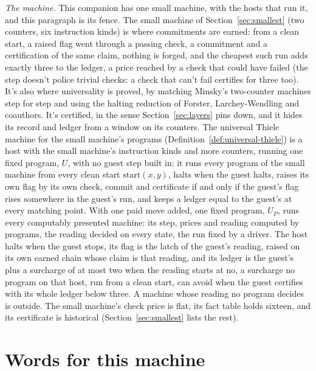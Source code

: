 \documentclass[11pt,twoside]{article}
\theoremstyle{thielethm}
\theoremstyle{thieledef}
\theoremstyle{thieledef}
\theoremstyle{thieledef}
\theoremstyle{thielethm}
\theoremstyle{thieleobs}
\theoremstyle{thielethm}
\begin{document}
\emph{The machine.} This companion has one small machine, with the hosts that run it,
and this paragraph is its fence. The small machine of
Section~\ref{sec:smallest} (two counters, six instruction kinds) is where commitments are
earned: from a clean start, a raised flag went through a passing check, a commitment and a certification of the
same claim, nothing is forged, and the cheapest such run adds exactly three to the ledger, a price reached
by a check that could have failed (the step doesn't police trivial checks: a check that can't
fail certifies for three too). It's also
where universality is proved, by matching Minsky's two-counter machines step for step and
using the halting reduction of Forster, Larchey-Wendling and coauthors. It's certified, in the
sense Section~\ref{sec:layers} pins down, and it hides its record and ledger from a window on its
counters. The universal Thiele machine for the small machine's
programs (Definition~\ref{def:universal-thiele}) is a host with the small machine's instruction
kinds and more counters, running one fixed program, $U$, with no guest step built
in: it runs every program of the small machine from every clean start $\mathrm{start}(x, y)$, halts when the guest halts, raises
its own flag by its own check, commit and certificate if and only if the guest's flag rises somewhere in the guest's run,
and keeps a ledger equal to the guest's at every matching point. With one paid move added, one
fixed program, $U_P$, runs every computably presented machine: its step, prices and
reading computed by programs, the reading decided on every state, the run fixed by a driver. The
host halts when the guest stops, its flag is the latch of the guest's reading, raised on its own
earned chain whose claim is that reading, and its ledger is the guest's plus a surcharge of at
most two when the reading starts at no, a surcharge no program on that host, run from a clean start, can avoid when the guest certifies
with its whole ledger below three. A machine whose reading no program decides is outside. The small machine's check price is flat, its fact table holds sixteen,
and its certificate is historical (Section~\ref{sec:smallest} lists the rest).

\section{Words for this machine}
\end{document}
